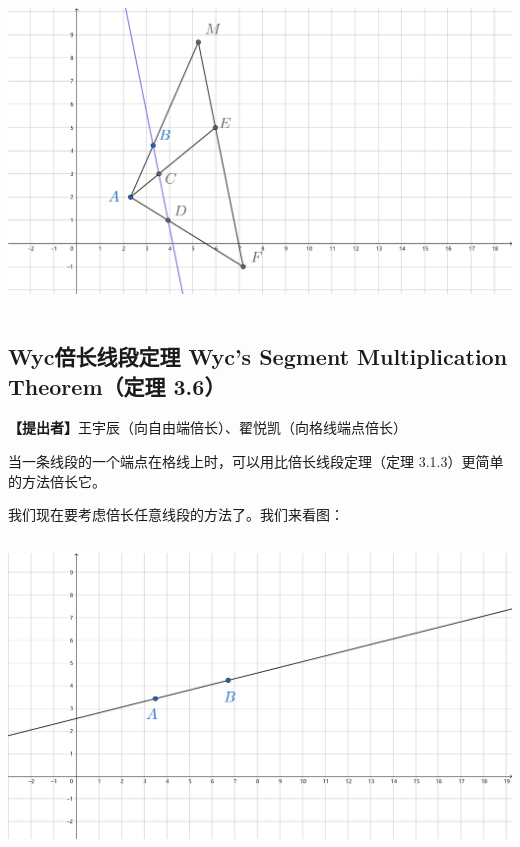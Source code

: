 \documentclass[UTF8]{article}
\begin{document}
\includegraphics[width=5.76806in,height=3.27292in]{media/image38.png}

\hypertarget{wycux500dux957fux7ebfux6bb5ux5b9aux7406-wycs-segment-multiplication-theoremux5b9aux7406-3.6}{%
\subsection{Wyc倍长线段定理 Wyc's Segment Multiplication Theorem（定理
3.6）}\label{wycux500dux957fux7ebfux6bb5ux5b9aux7406-wycs-segment-multiplication-theoremux5b9aux7406-3.6}}

\textbf{【提出者】}王宇辰（向自由端倍长）、翟悦凯（向格线端点倍长）

当一条线段的一个端点在格线上时，可以用比倍长线段定理（定理
3.1.3）更简单的方法倍长它。

我们现在要考虑倍长任意线段的方法了。我们来看图：

\includegraphics[width=5.76806in,height=3.27292in]{media/image39.png}
\end{document}
